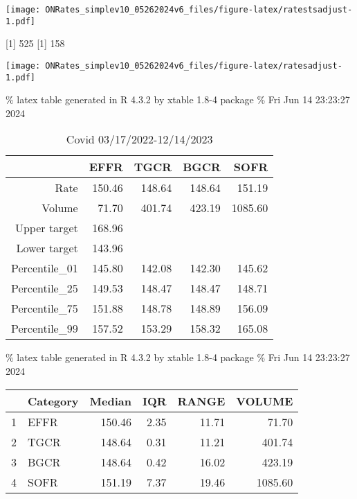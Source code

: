 \documentclass[
]{article}
\let\origfigure\figure
\let\endorigfigure\endfigure
\renewenvironment{figure}[1][2] {
    \expandafter\origfigure\expandafter[H]
} {
    \endorigfigure
}
\begin{document}
\begin{figure}
\centering
\texttt{[image: ONRates\_simplev10\_05262024v6\_files/figure-latex/ratestsadjust-1.pdf]}
\caption{\label{fig:ratestsadjust}Rates during mid cycle adjustment 8/1/2019-10/31/2019}
\end{figure}

{[}1{]} 525
{[}1{]} 158

\begin{figure}
\centering
\texttt{[image: ONRates\_simplev10\_05262024v6\_files/figure-latex/ratesadjust-1.pdf]}
\caption{\label{fig:ratesadjust}EFFR during adjustment period 8/1/2019-10/31/2019}
\end{figure}

\% latex table generated in R 4.3.2 by xtable 1.8-4 package
\% Fri Jun 14 23:23:27 2024

\begin{table}[ht]
\centering
\begin{tabular}{rrrrr}
  \hline
 & EFFR & TGCR & BGCR & SOFR \\ 
  \hline
Rate & 150.46 & 148.64 & 148.64 & 151.19 \\ 
  Volume & 71.70 & 401.74 & 423.19 & 1085.60 \\ 
  Upper target & 168.96 &  &  &  \\ 
  Lower target & 143.96 &  &  &  \\ 
  Percentile\_01 & 145.80 & 142.08 & 142.30 & 145.62 \\ 
  Percentile\_25 & 149.53 & 148.47 & 148.47 & 148.71 \\ 
  Percentile\_75 & 151.88 & 148.78 & 148.89 & 156.09 \\ 
  Percentile\_99 & 157.52 & 153.29 & 158.32 & 165.08 \\ 
   \hline
\end{tabular}
\caption{Covid 03/17/2022-12/14/2023} 
\end{table}

\% latex table generated in R 4.3.2 by xtable 1.8-4 package
\% Fri Jun 14 23:23:27 2024

\begin{table}[ht]
\centering
\begin{tabular}{rlrrrr}
  \hline
 & Category & Median & IQR & RANGE & VOLUME \\ 
  \hline
1 & EFFR & 150.46 & 2.35 & 11.71 & 71.70 \\ 
  2 & TGCR & 148.64 & 0.31 & 11.21 & 401.74 \\ 
  3 & BGCR & 148.64 & 0.42 & 16.02 & 423.19 \\ 
  4 & SOFR & 151.19 & 7.37 & 19.46 & 1085.60 \\ 
   \hline
\end{tabular}
\end{table}
\end{document}
